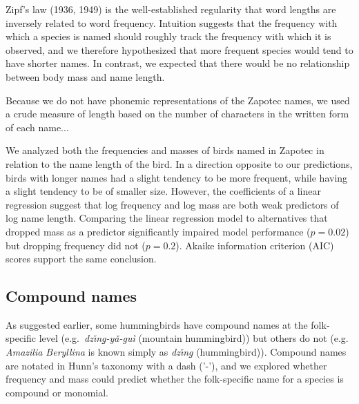 \documentclass[10pt,letterpaper]{article}
\begin{document}
Zipf's law (1936, 1949)\nocite{zipf1936psycho,zipf1949human} is the well-established regularity that word lengths are  inversely related to word frequency. Intuition suggests that the frequency with which a species is named should roughly track the frequency with which it is observed, and we therefore hypothesized that more frequent species would tend to have shorter names.  In contrast, we expected that there would be no relationship between body mass and name length. 

Because we do not have phonemic representations of the Zapotec names, we used a crude measure of length based on the number of characters in the written form of each name...

We analyzed both the frequencies and masses of birds named in Zapotec in relation to the name length of the bird. In a direction opposite to our predictions, birds with longer names had a slight tendency to be more frequent, while having a slight tendency to be of smaller size. However, the coefficients of a linear regression suggest that log frequency and log mass are both weak predictors of log name length. Comparing the linear regression model to alternatives that dropped mass as a predictor significantly impaired model performance ($p = 0.02$) but dropping frequency did not ($p = 0.2$). Akaike information criterion (AIC) scores support the same conclusion.



\subsection{Compound names}

As suggested earlier, some hummingbirds have compound names at the folk-specific level (e.g.\ \textit{dz\v{\i}n\b{g}-y\v{a}-gu\`{i}} (mountain hummingbird)) but others do not (e.g.\   
\emph{ Amazilia Beryllina} is known simply as \textit{dz\v{\i}n\b{g}} (hummingbird)). Compound names are notated in Hunn's taxonomy with a dash ('-'), and we explored whether frequency and mass could predict whether the folk-specific name for a species is compound or monomial. 
\end{document}
